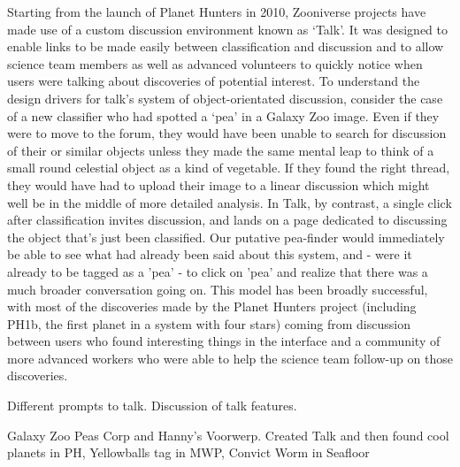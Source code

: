 \documentclass{sigchi}
\begin{document}
Starting from the launch of Planet Hunters in 2010, Zooniverse projects have made use of a custom discussion environment known as `Talk'. It was designed to enable links to be made easily between classification and discussion and to allow science team members as well as advanced volunteers to quickly notice when users were talking about discoveries of potential interest. To understand the design drivers for talk's system of object-orientated discussion, consider the case of a new classifier who had spotted a `pea' in a Galaxy Zoo image. Even if they were to move to the forum, they would have been unable to search for discussion of their or similar objects unless they made the same mental leap to think of a small round celestial object as a kind of vegetable. If they found the right thread, they would have had to upload their image to a linear discussion which might well be in the middle of more detailed analysis. In Talk, by contrast, a single click after classification invites discussion, and lands on a page dedicated to discussing the object that's just been classified. Our putative pea-finder would immediately be able to see what had already been said about this system, and - were it already to be tagged as a 'pea' - to click on 'pea' and realize that there was a much broader conversation going on. This model has been broadly successful, with most of the discoveries made by the Planet Hunters project (including PH1b, the first planet in a system with four stars) coming from discussion between users who found interesting things in the interface and a community of more advanced workers who were able to help the science team follow-up on those discoveries. 

Different prompts to talk.
Discussion of talk features. 

Galaxy Zoo Peas Corp and Hanny's Voorwerp.
Created Talk and then found cool planets in PH, Yellowballs tag in MWP, Convict Worm in Seafloor


\end{document}
